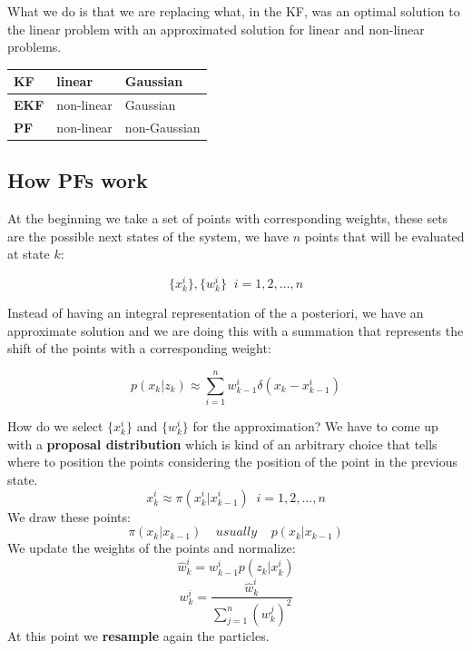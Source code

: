 What we do is that we are replacing what, in the KF, was an optimal solution to the linear problem with an approximated solution for linear and non-linear problems.

\begin{table}[H]
    \begin{tabular}{|l|l|l|}
    \hline
    \textbf{KF}  & linear     & Gaussian     \\ \hline
    \textbf{EKF} & non-linear & Gaussian     \\ \hline
    \textbf{PF}  & non-linear & non-Gaussian \\ \hline
    \end{tabular}
\end{table}

\subsection{How PFs work}

At the beginning we take a set of points with corresponding weights, these sets are the possible next states of the system, we have $n$ points that will be evaluated at state $k$:

\[
    \{x^i_{k}\},\{ w^i_{k}\}\;\;i=1,2,\dots,n
\]

Instead of having an integral representation of the a posteriori, we have an approximate solution and we are doing this with a summation that represents the shift of the points with a corresponding weight:

\[
    p(x_k|z_k) \approx \sum_{i=1}^{n} w^i_{k-1}\delta(x_k-x^i_{k-1})  
\]

How do we select \(\{x^i_{k}\}\) and \(\{ w^i_{k}\}\) for the approximation? We have to come up with a \textbf{proposal distribution} which is kind of an arbitrary choice that tells where to position the points considering the position of the point in the previous state.
\[
    x^i_k \approx \pi(x^i_k|x^i_{k-1})\;\;i=1,2,\dots,n
\]
We draw these points:
\[
    \pi(x_k|x_{k-1})\;\;\;\; usually \;\;\;\; p(x_k|x_{k-1})
\]
We update the weights of the points and normalize:
\[
    \hat{w}^i_k = w^i_{k-1}p(z_k|x^i_k)    
\]
\[
    w^i_k = \frac{\hat{w}^i_k}{\sum_{j=1}^{n}(w^j_k)^2}    
\]
At this point we \textbf{resample} again the particles.

